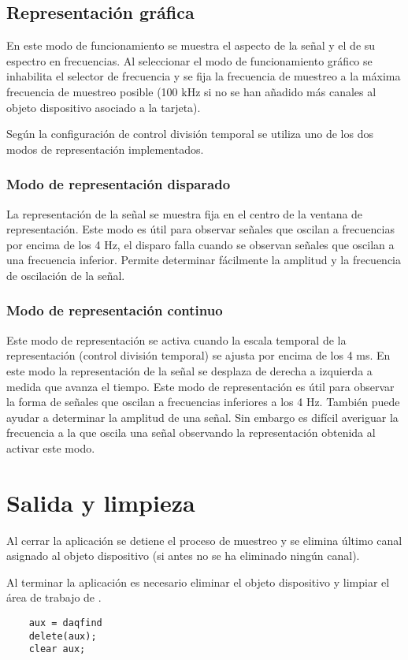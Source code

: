 \subsection{Representación gráfica}

En este modo de funcionamiento se muestra el aspecto de la señal y el de su
espectro en frecuencias. Al seleccionar el modo de funcionamiento gráfico
se inhabilita el selector de frecuencia y se fija la frecuencia de muestreo
a la máxima frecuencia de muestreo posible (100 kHz si no se han añadido
más canales al objeto dispositivo asociado a la tarjeta).

Según la configuración de control división temporal se utiliza uno de los
dos modos de representación implementados.


\subsubsection{Modo de representación disparado}

La representación de la señal se muestra fija en el centro de la ventana de
representación. Este modo es útil para observar señales que oscilan a
frecuencias por encima de los 4 Hz, el disparo falla cuando se observan
señales que oscilan a una frecuencia inferior. Permite determinar
fácilmente la amplitud y la frecuencia de oscilación de la señal.


\subsubsection{Modo de representación continuo}

Este modo de representación se activa cuando la escala temporal de la
representación (control división temporal) se ajusta por encima de los 4
ms. En este modo la representación de la señal se desplaza de derecha a
izquierda a medida que avanza el tiempo. Este modo de representación es
útil para observar la forma de señales que oscilan a frecuencias inferiores
a los 4 Hz. También puede ayudar a determinar la amplitud de una señal. Sin
embargo es difícil averiguar la frecuencia a la que oscila una señal
observando la representación obtenida al activar este modo.


\section{Salida y limpieza}

Al cerrar la aplicación se detiene el proceso de muestreo y se elimina
último canal asignado al objeto dispositivo (si antes no se ha eliminado
ningún canal).

Al terminar la aplicación es necesario eliminar el objeto dispositivo y
limpiar el área de trabajo de \matlab{}.

\begin{center}
    \begin{lstlisting}
	aux = daqfind
	delete(aux);
	clear aux;
    \end{lstlisting}
\end{center}
